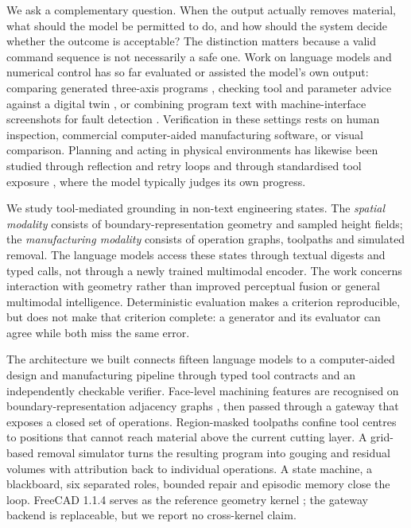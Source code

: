 We ask a complementary question. When the output actually removes material, what should the model be permitted to do, and how should the system decide whether the outcome is acceptable? The distinction matters because a valid command sequence is not necessarily a safe one. Work on language models and numerical control has so far evaluated or assisted the model's own output: comparing generated three-axis programs \cite{Sket2025}, checking tool and parameter advice against a digital twin \cite{Enis2026}, or combining program text with machine-interface screenshots for fault detection \cite{Pour2025}. Verification in these settings rests on human inspection, commercial computer-aided manufacturing software, or visual comparison. Planning and acting in physical environments has likewise been studied through reflection and retry loops \cite{Yao2023ReAct,Shinn2023Reflexion} and through standardised tool exposure \cite{Anthropic2024MCP}, where the model typically judges its own progress.

We study tool-mediated grounding in non-text engineering states. The \emph{spatial modality} consists of boundary-representation geometry and sampled height fields; the \emph{manufacturing modality} consists of operation graphs, toolpaths and simulated removal. The language models access these states through textual digests and typed calls, not through a newly trained multimodal encoder. The work concerns interaction with geometry rather than improved perceptual fusion or general multimodal intelligence. Deterministic evaluation makes a criterion reproducible, but does not make that criterion complete: a generator and its evaluator can agree while both miss the same error.

The architecture we built connects fifteen language models to a computer-aided design and manufacturing pipeline through typed tool contracts and an independently checkable verifier. Face-level machining features are recognised on boundary-representation adjacency graphs \cite{Colligan2022}, then passed through a gateway that exposes a closed set of operations. Region-masked toolpaths confine tool centres to positions that cannot reach material above the current cutting layer. A grid-based removal simulator turns the resulting program into gouging and residual volumes with attribution back to individual operations. A state machine, a blackboard, six separated roles, bounded repair and episodic memory close the loop. FreeCAD 1.1.4 serves as the reference geometry kernel \cite{FreeCAD2025}; the gateway backend is replaceable, but we report no cross-kernel claim.


